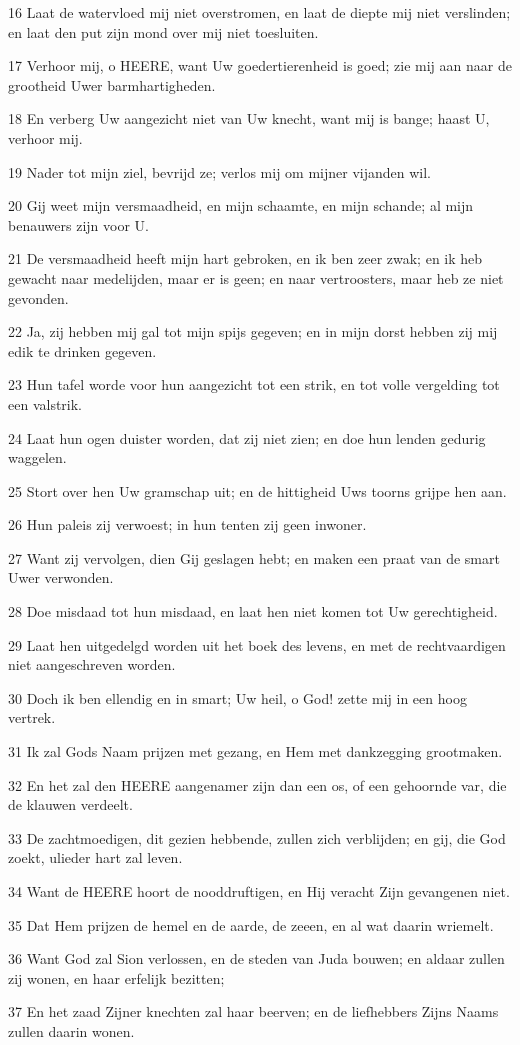 \par 16 Laat de watervloed mij niet overstromen, en laat de diepte mij niet verslinden; en laat den put zijn mond over mij niet toesluiten.
\par 17 Verhoor mij, o HEERE, want Uw goedertierenheid is goed; zie mij aan naar de grootheid Uwer barmhartigheden.
\par 18 En verberg Uw aangezicht niet van Uw knecht, want mij is bange; haast U, verhoor mij.
\par 19 Nader tot mijn ziel, bevrijd ze; verlos mij om mijner vijanden wil.
\par 20 Gij weet mijn versmaadheid, en mijn schaamte, en mijn schande; al mijn benauwers zijn voor U.
\par 21 De versmaadheid heeft mijn hart gebroken, en ik ben zeer zwak; en ik heb gewacht naar medelijden, maar er is geen; en naar vertroosters, maar heb ze niet gevonden.
\par 22 Ja, zij hebben mij gal tot mijn spijs gegeven; en in mijn dorst hebben zij mij edik te drinken gegeven.
\par 23 Hun tafel worde voor hun aangezicht tot een strik, en tot volle vergelding tot een valstrik.
\par 24 Laat hun ogen duister worden, dat zij niet zien; en doe hun lenden gedurig waggelen.
\par 25 Stort over hen Uw gramschap uit; en de hittigheid Uws toorns grijpe hen aan.
\par 26 Hun paleis zij verwoest; in hun tenten zij geen inwoner.
\par 27 Want zij vervolgen, dien Gij geslagen hebt; en maken een praat van de smart Uwer verwonden.
\par 28 Doe misdaad tot hun misdaad, en laat hen niet komen tot Uw gerechtigheid.
\par 29 Laat hen uitgedelgd worden uit het boek des levens, en met de rechtvaardigen niet aangeschreven worden.
\par 30 Doch ik ben ellendig en in smart; Uw heil, o God! zette mij in een hoog vertrek.
\par 31 Ik zal Gods Naam prijzen met gezang, en Hem met dankzegging grootmaken.
\par 32 En het zal den HEERE aangenamer zijn dan een os, of een gehoornde var, die de klauwen verdeelt.
\par 33 De zachtmoedigen, dit gezien hebbende, zullen zich verblijden; en gij, die God zoekt, ulieder hart zal leven.
\par 34 Want de HEERE hoort de nooddruftigen, en Hij veracht Zijn gevangenen niet.
\par 35 Dat Hem prijzen de hemel en de aarde, de zeeen, en al wat daarin wriemelt.
\par 36 Want God zal Sion verlossen, en de steden van Juda bouwen; en aldaar zullen zij wonen, en haar erfelijk bezitten;
\par 37 En het zaad Zijner knechten zal haar beerven; en de liefhebbers Zijns Naams zullen daarin wonen.

